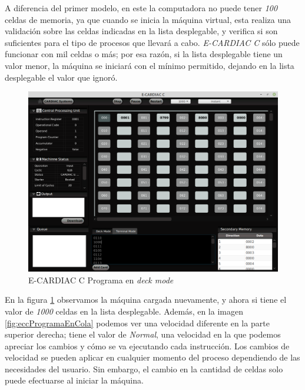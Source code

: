 \documentclass[letterpaper,12pt,oneside]{book}
\begin{document}
			A diferencia del primer modelo, en este la computadora no puede tener 
			\textit{100} 
			celdas de memoria, ya que cuando se inicia la máquina virtual,
			esta realiza una validación sobre las celdas indicadas en la lista desplegable, y verifica si son suficientes para el tipo de procesos que 
			llevará 
			a cabo. 
			\textit{E-CARDIAC C}
			sólo puede funcionar con mil celdas o más; por esa razón, si la lista desplegable tiene un valor menor, la
			máquina se iniciará con el mínimo permitido, dejando en la lista desplegable el valor que ignoró.

        \begin{figure}[h]		
			\centering
			\includegraphics[scale=0.4]{media/CARDIACC/cardiaccProgramaEnDeck.png}
			\caption{E-CARDIAC C Programa en \textit{deck mode}}
			\label{fig:eccProgramaenDeck}
		\end{figure}		
   
            
   
            En
			la figura \ref{fig:eccProgramaenDeck} observamos la máquina cargada nuevamente, y ahora si tiene el valor de \textit{1000} celdas en la 
			lista 
			desplegable. Además,
			en la imagen \ref{fig:eccProgramaEnCola} podemos ver una velocidad diferente
            en la parte superior derecha;
			tiene el valor de \textit{Normal}, una velocidad en la que podemos apreciar los cambios y cómo se va ejecutando cada instrucción. Los 
			cambios de velocidad se pueden aplicar en cualquier momento del proceso dependiendo de las necesidades del usuario. Sin embargo, el cambio 
			en la 
			cantidad 
			de celdas solo puede efectuarse al iniciar la máquina.
			
\end{document}
